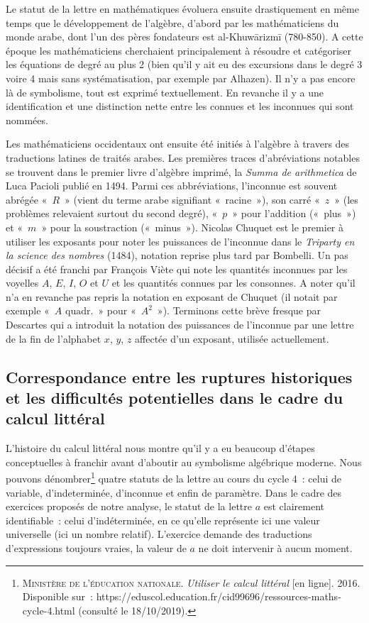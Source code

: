 \documentclass{report}
\theoremstyle{definition}
\begin{document}
Le statut de la lettre en mathématiques évoluera ensuite drastiquement en même temps que le développement de l'algèbre, d'abord par les mathématiciens du monde arabe, dont l'un des pères fondateurs est al-Khuwārizmī (780-850). A cette époque les mathématiciens cherchaient principalement à résoudre et catégoriser les équations de degré au plus 2 (bien qu'il y ait eu des excursions dans le degré 3 voire 4 mais sans systématisation, par exemple par Alhazen). Il n'y a pas encore là de symbolisme, tout est exprimé textuellement. En revanche il y a une identification et une distinction nette entre les connues et les inconnues qui sont nommées.

Les mathématiciens occidentaux ont ensuite été initiés à l'algèbre à travers des traductions latines de traités arabes. Les premières traces d'abréviations notables se trouvent dans le premier livre d'algèbre imprimé, la \textit{Summa de arithmetica} de Luca Pacioli publié en 1494. Parmi ces abbréviations, l'inconnue est souvent abrégée «~$R$~» (vient du terme arabe signifiant «~racine~»), son carré «~$z$~» (les problèmes relevaient surtout du second degré), «~$p$~» pour l'addition («~plus~») et «~$m$~» pour la soustraction («~minus~»). Nicolas Chuquet est le premier à utiliser les exposants pour noter les puissances de l'inconnue dans le \textit{Triparty en la science des nombres} (1484), notation reprise plus tard par Bombelli. Un pas décisif a été franchi par François Viète qui note les quantités inconnues par les voyelles $A$, $E$, $I$, $O$ et $U$ et les quantités connues par les consonnes. A noter qu'il n'a en revanche pas repris la notation en exposant de Chuquet (il notait par exemple «~$A\textrm{ quadr.}$~» pour «~$A^2$~»). Terminons cette brève fresque par Descartes qui a introduit la notation des puissances de l'inconnue par une lettre de la fin de l'alphabet $x$, $y$, $z$ affectée d'un exposant, utilisée actuellement.

\subsection*{Correspondance entre les ruptures historiques et les difficultés potentielles dans le cadre du calcul littéral}

L'histoire du calcul littéral nous montre qu'il y a eu beaucoup d'étapes conceptuelles à franchir avant d'aboutir au symbolisme algébrique moderne. Nous pouvons dénombrer\footnote{\textsc{Ministère de l'éducation nationale}. \textit{Utiliser le calcul littéral} [en ligne]. 2016. Disponible sur~: https://eduscol.education.fr/cid99696/ressources-maths-cycle-4.html (consulté le 18/10/2019).} quatre statuts de la lettre au cours du cycle 4~: celui de variable, d'indeterminée, d'inconnue et enfin de paramètre. Dans le cadre des exercices proposés de notre analyse, le statut de la lettre $a$ est clairement identifiable~: celui d'indéterminée, en ce qu'elle représente ici une valeur universelle (ici un nombre relatif). L'exercice demande des traductions d'expressions toujours vraies, la valeur de $a$ ne doit intervenir à aucun moment.
\end{document}
